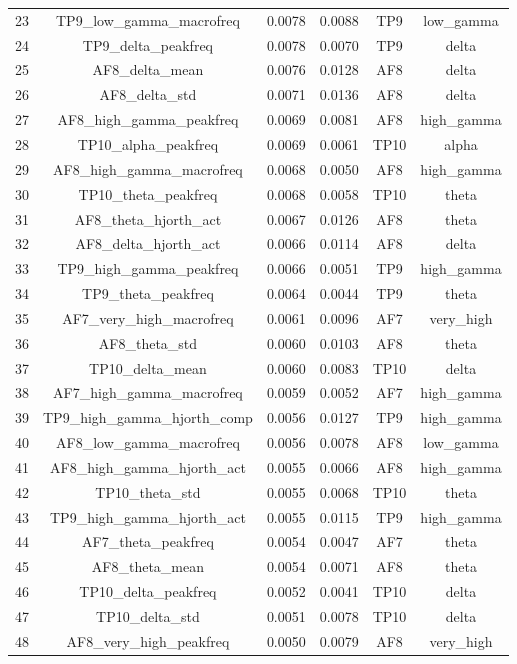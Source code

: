 \begin{table}[hptb]
\begin{table}
\begin{tabular}{cccccc}
23 & TP9_low_gamma_macrofreq & 0.0078 & 0.0088 & TP9 & low_gamma \\
24 & TP9_delta_peakfreq & 0.0078 & 0.0070 & TP9 & delta \\
25 & AF8_delta_mean & 0.0076 & 0.0128 & AF8 & delta \\
26 & AF8_delta_std & 0.0071 & 0.0136 & AF8 & delta \\
27 & AF8_high_gamma_peakfreq & 0.0069 & 0.0081 & AF8 & high_gamma \\
28 & TP10_alpha_peakfreq & 0.0069 & 0.0061 & TP10 & alpha \\
29 & AF8_high_gamma_macrofreq & 0.0068 & 0.0050 & AF8 & high_gamma \\
30 & TP10_theta_peakfreq & 0.0068 & 0.0058 & TP10 & theta \\
31 & AF8_theta_hjorth_act & 0.0067 & 0.0126 & AF8 & theta \\
32 & AF8_delta_hjorth_act & 0.0066 & 0.0114 & AF8 & delta \\
33 & TP9_high_gamma_peakfreq & 0.0066 & 0.0051 & TP9 & high_gamma \\
34 & TP9_theta_peakfreq & 0.0064 & 0.0044 & TP9 & theta \\
35 & AF7_very_high_macrofreq & 0.0061 & 0.0096 & AF7 & very_high \\
36 & AF8_theta_std & 0.0060 & 0.0103 & AF8 & theta \\
37 & TP10_delta_mean & 0.0060 & 0.0083 & TP10 & delta \\
38 & AF7_high_gamma_macrofreq & 0.0059 & 0.0052 & AF7 & high_gamma \\
39 & TP9_high_gamma_hjorth_comp & 0.0056 & 0.0127 & TP9 & high_gamma \\
40 & AF8_low_gamma_macrofreq & 0.0056 & 0.0078 & AF8 & low_gamma \\
41 & AF8_high_gamma_hjorth_act & 0.0055 & 0.0066 & AF8 & high_gamma \\
42 & TP10_theta_std & 0.0055 & 0.0068 & TP10 & theta \\
43 & TP9_high_gamma_hjorth_act & 0.0055 & 0.0115 & TP9 & high_gamma \\
44 & AF7_theta_peakfreq & 0.0054 & 0.0047 & AF7 & theta \\
45 & AF8_theta_mean & 0.0054 & 0.0071 & AF8 & theta \\
46 & TP10_delta_peakfreq & 0.0052 & 0.0041 & TP10 & delta \\
47 & TP10_delta_std & 0.0051 & 0.0078 & TP10 & delta \\
48 & AF8_very_high_peakfreq & 0.0050 & 0.0079 & AF8 & very_high \\

\end{tabular}
\end{table}
\end{table}
